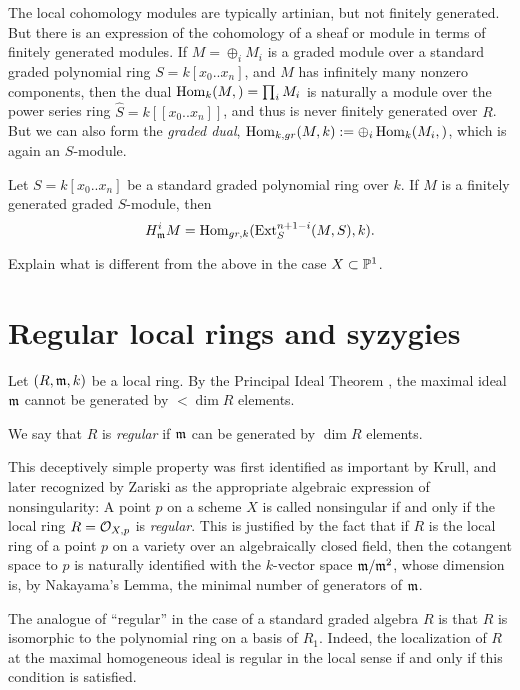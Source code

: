 The local cohomology modules  are typically artinian, but not finitely generated. But there is an 
expression of the cohomology of a sheaf or module in terms of finitely generated modules. If
$M = \oplus_{i} M_{i}$ is a graded module over a standard graded polynomial ring $S = k[x_{0}..x_{n}]$, and $M$ has infinitely many nonzero components, then the dual 
$\Hom_{k}(M,) = \prod_{i} M_{i}$ is naturally a module over the power series ring 
$\hat S = k[[x_{0}..x_{n}]]$, and thus is never finitely generated over $R$. But we can also form the
\emph{graded dual}, $\Hom_{k,gr}(M,k) := \oplus_{i}\Hom_{k}(M_{i},)$, which is again an $S$-module.

\begin{theorem}\label{local duality}
Let $S = k[x_{0}..x_{n}]$ be a standard graded polynomial ring over $k$. If $M$ is a finitely generated graded $S$-module, then
$$
H^{i}_{\gm} M = \Hom_{gr,k}(\Ext_{S}^{n+1-i}(M,S), k).
$$
\end{theorem}
\begin{exercise}
 Explain what is different from the above in the case $X\subset \PP^{1}$.
\end{exercise}


\section{Regular local rings and syzygies}
Let $(R,\gm,k)$ be a local ring. By the Principal Ideal Theorem \cite[]{E}, the maximal ideal $\gm$ cannot be generated by  $<\dim R$ elements.

\begin{definition}
 We say that $R$ is \emph{regular} if $\gm$ can be generated by $\dim R$ elements.
\end{definition}

This deceptively simple property was first identified as important by Krull, and later recognized by Zariski as the appropriate algebraic expression of nonsingularity: A point $p$ on a scheme $X$ is called nonsingular if and only if the local ring $R = \sO_{X,p}$ is \emph{regular}. This is justified by the fact that if $R$ is the local ring of a point $p$ on a variety over an algebraically closed field, then the cotangent space to $p$ is naturally identified with the 
$k$-vector space $\gm/\gm^{2}$, whose dimension is, by Nakayama's Lemma, the minimal number of generators of $\gm$. 

The analogue of ``regular'' in the case of a standard graded algebra $R$ is that $R$ is isomorphic to the 
polynomial ring on a basis of $R_{1}$. Indeed, the localization of $R$ at the maximal homogeneous ideal is regular in the local sense if and only if this condition is satisfied.

